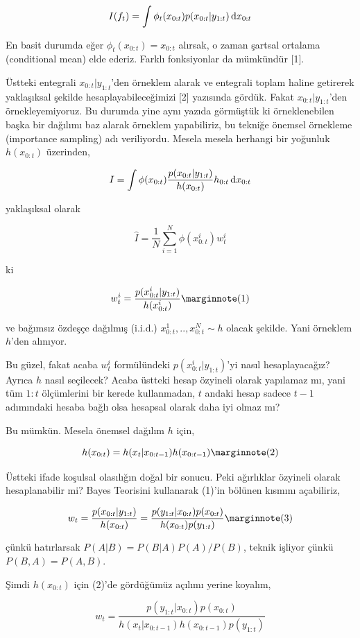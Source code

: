 \documentclass[12pt,fleqn]{article}\usepackage{../../common}
\begin{document}
$$ I(f_t) = \int \phi_t(x_{0:t}) p(x_{0:t} | y_{1:t}) \,\mathrm{d} x_{0:t} $$

En basit durumda eğer $\phi_t(x_{0:t}) =x_{0:t}$ alırsak, o zaman şartsal
ortalama (conditional mean) elde ederiz. Farklı fonksiyonlar da mümkündür [1].

Üstteki entegrali $x_{0:t} | y_{1:t}$'den örneklem alarak ve entegrali
toplam haline getirerek yaklaşıksal şekilde hesaplayabileceğimizi [2]
yazısında gördük. Fakat $x_{0:t} | y_{1:t}$'den örnekleyemiyoruz. Bu
durumda yine aynı yazıda görmüştük ki örneklenebilen başka bir dağılımı baz
alarak örneklem yapabiliriz, bu tekniğe önemsel örnekleme (importance
sampling) adı veriliyordu. Mesela mesela herhangi bir yoğunluk $h(x_{0:t})$
üzerinden,

$$ I = \int
\phi(x_{0:t})
\frac{ p(x_{0:t}|y_{1:t}) }{ h(x_{0:t}) } h_{0:t} \,\mathrm{d} x_{0:t}
$$

yaklaşıksal olarak

$$ \hat{I} = \frac{1}{N} \sum _{i=1}^{N} \phi (x^i_{0:t}) w^i_t  $$

ki

$$ 
w^i_t = \frac{p(x^i_{0:t}|y_{1:t})}{h(x^i_{0:t})} 
\mlabel{1} 
$$

ve bağımsız özdeşçe dağılmış (i.i.d.) $x^1_{0:t}, .., x^N_{0:t} \sim h$
olacak şekilde. Yani örneklem $h$'den alınıyor.

Bu güzel, fakat acaba $w^i_t$ formülündeki $p(x^i_{0:t}|y_{1:t})$'yi nasıl
hesaplayacağız? Ayrıca $h$ nasıl seçilecek? Acaba üstteki hesap özyineli olarak
yapılamaz mı, yani tüm $1:t$ ölçümlerini bir kerede kullanmadan, $t$ andaki
hesap sadece $t-1$ adımındaki hesaba bağlı olsa hesapsal olarak daha iyi olmaz
mı?

Bu mümkün. Mesela önemsel dağılım $h$ için,

$$ 
h(x_{0:t}) = h(x_t | x_{0:t-1}) h(x_{{0:t-1}}) 
\mlabel{2}
$$

Üstteki ifade koşulsal olasılığın doğal bir sonucu. Peki ağırlıklar özyineli
olarak hesaplanabilir mi? Bayes Teorisini kullanarak (1)'in bölünen kısmını
açabiliriz,

$$
w_t =
\frac{p(x_{0:t}|y_{1:t})}{h(x_{0:t})} =
\frac{p(y_{1:t}|x_{0:t}) p(x_{0:t})}{h(x_{0:t})p(y_{1:t}) }
\mlabel{3}
$$

çünkü hatırlarsak $P(A|B) = P(B|A)P(A) / P(B)$, teknik işliyor çünkü
$P(B,A)=P(A,B)$.  

Şimdi $h(x_{0:t})$ için (2)'de gördüğümüz açılımı yerine koyalım,

$$ w_t =
\frac{p(y_{1:t}|x_{0:t}) p(x_{0:t})}{h(x_t | x_{0:t-1}) h(x_{{0:t-1}}) p(y_{1:t}) }
$$
\end{document}
